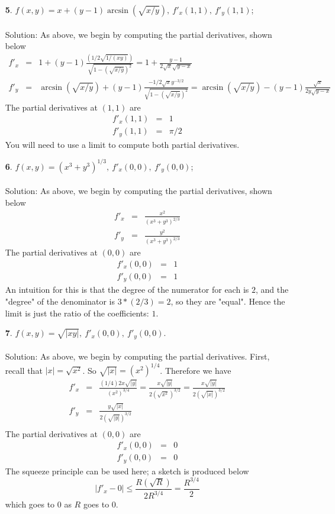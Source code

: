 \documentclass[12pt]{amsbook}
\begin{document}
\begin{enumerate}
\item[{\small\bf 5}.] $f(x,y)= x+(y-1)\arcsin(\sqrt{x/y}), \ f'_x(1,1), \ f'_y(1,1)$; 
\\
\\
{\sc Solution}: As above, we begin by computing the partial derivatives, shown below
\begin{eqnarray*}
f'_x&=&1+(y-1)\frac{(1/2\sqrt{1/(xy)})}{\sqrt{1-(\sqrt{x/y})^2}}=1+\frac{y-1}{2\sqrt{x}\sqrt{y-x}} \\
f'_y&=&\arcsin(\sqrt{x/y})+(y-1)\frac{-1/2\sqrt{x}y^{-3/2}}{\sqrt{1-(\sqrt{x/y})^2}}=\arcsin(\sqrt{x/y})-(y-1)\frac{\sqrt{x}}{2y\sqrt{y-x}}
\end{eqnarray*}
The partial derivatives at $(1,1)$ are
\begin{eqnarray*}
f'_x(1,1)&=&1\\
f'_y(1,1)&=&\pi/2
\end{eqnarray*}
You will need to use a limit to compute both partial derivatives.
\\
\item[{\small\bf 6}.] $f(x,y)= (x^3+y^3)^{1/3}, \ f'_x(0,0), \ f'_y(0,0) $; 
\\
\\
{\sc Solution}: As above, we begin by computing the partial derivatives, shown below
\begin{eqnarray*}
f'_x&=&\frac{x^2}{(x^3+y^3)^{2/3}} \\
f'_y&=&\frac{y^2}{(x^3+y^3)^{2/3}} 
\end{eqnarray*}
The partial derivatives at $(0,0)$ are
\begin{eqnarray*}
f'_x(0,0)&=&1\\
f'_y(0,0)&=&1
\end{eqnarray*}
An intuition for this is that the degree of the numerator for each is $2$, and the "degree" of the denominator is $3*(2/3)=2$, so they are "equal". Hence the limit is just the ratio of the coefficients: $1$.
\\
\item[{\small\bf 7}.] $f(x,y)= \sqrt{|xy|}, \ f'_x(0,0), \ f'_y(0,0)$. 
\\
\\
{\sc Solution}: As above, we begin by computing the partial derivatives. First, recall that $|x|=\sqrt{x^2}$. So $\sqrt{|x|}=(x^2)^{1/4}$. Therefore we have
\begin{eqnarray*}
f'_x&=&\frac{(1/4)2x\sqrt{|y|}}{(x^2)^{3/4}} = \frac{x\sqrt{|y|}}{2(\sqrt{x^2})^{3/2}}= \frac{x\sqrt{|y|}}{2(\sqrt{|x|})^{3/2}}\\
f'_y&=& \frac{y\sqrt{|x|}}{2(\sqrt{|y|})^{3/2}}\\
\end{eqnarray*}
The partial derivatives at $(0,0)$ are
\begin{eqnarray*}
f'_x(0,0)&=&0\\
f'_y(0,0)&=&0
\end{eqnarray*}
The squeeze principle can be used here; a sketch is produced below
$$|f'_x-0|\leq \frac{R(\sqrt{R})}{2R^{3/4}}=\frac{R^{3/4}}{2}$$
which goes to $0$ as $R$ goes to $0$.
\\
\end{enumerate}
\end{document}
